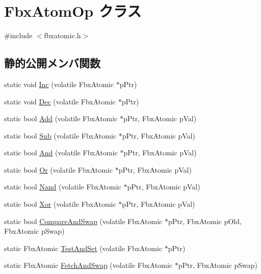 \hypertarget{class_fbx_atom_op}{}\section{Fbx\+Atom\+Op クラス}
\label{class_fbx_atom_op}


{\ttfamily \#include $<$fbxatomic.\+h$>$}

\subsection*{静的公開メンバ関数}
\begin{DoxyCompactItemize}
\item 
static void \hyperlink{class_fbx_atom_op_a8eb5901c61891a6203d2ac10e139fd37}{Inc} (volatile Fbx\+Atomic $\ast$p\+Ptr)
\item 
static void \hyperlink{class_fbx_atom_op_a4be312e100244ff3688814e6c2143d29}{Dec} (volatile Fbx\+Atomic $\ast$p\+Ptr)
\item 
static bool \hyperlink{class_fbx_atom_op_aa542a502e1881026c6936deb39c9641e}{Add} (volatile Fbx\+Atomic $\ast$p\+Ptr, Fbx\+Atomic p\+Val)
\item 
static bool \hyperlink{class_fbx_atom_op_a9b18f6c0282cd22995b64691a77718c1}{Sub} (volatile Fbx\+Atomic $\ast$p\+Ptr, Fbx\+Atomic p\+Val)
\item 
static bool \hyperlink{class_fbx_atom_op_a76ab2e12877aae1b3f5a9625a04e1aac}{And} (volatile Fbx\+Atomic $\ast$p\+Ptr, Fbx\+Atomic p\+Val)
\item 
static bool \hyperlink{class_fbx_atom_op_ad81d13985005870d9274424b03a5702b}{Or} (volatile Fbx\+Atomic $\ast$p\+Ptr, Fbx\+Atomic p\+Val)
\item 
static bool \hyperlink{class_fbx_atom_op_ae28cca443f51ae79622f9b76693f7de7}{Nand} (volatile Fbx\+Atomic $\ast$p\+Ptr, Fbx\+Atomic p\+Val)
\item 
static bool \hyperlink{class_fbx_atom_op_a30a91a335e4ccf4b40a4681697ea2478}{Xor} (volatile Fbx\+Atomic $\ast$p\+Ptr, Fbx\+Atomic p\+Val)
\item 
static bool \hyperlink{class_fbx_atom_op_a2f91e98684ce91ba6ef1764ba7b02146}{Compare\+And\+Swap} (volatile Fbx\+Atomic $\ast$p\+Ptr, Fbx\+Atomic p\+Old, Fbx\+Atomic p\+Swap)
\item 
static Fbx\+Atomic \hyperlink{class_fbx_atom_op_af84c36d501a05600e44f4ef6a3477d2a}{Test\+And\+Set} (volatile Fbx\+Atomic $\ast$p\+Ptr)
\item 
static Fbx\+Atomic \hyperlink{class_fbx_atom_op_a794938359397610bea4bfb4e5f005ab3}{Fetch\+And\+Swap} (volatile Fbx\+Atomic $\ast$p\+Ptr, Fbx\+Atomic p\+Swap)

\end{DoxyCompactItemize}
